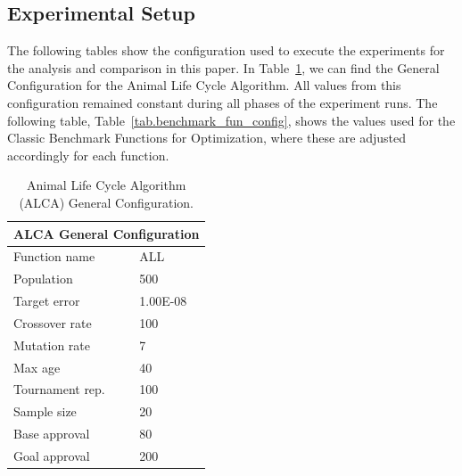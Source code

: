 \documentclass[graybox]{svmult}
\begin{document}
    \subsection{Experimental Setup} 

        The following tables show the configuration used to execute the experiments for
        the analysis and comparison in this paper. In
        Table~\ref{tab.general_configuration}, we can find the General Configuration
        for the Animal Life Cycle Algorithm. All values from this configuration
        remained constant during all phases of the experiment runs. The following
        table, Table~\ref{tab.benchmark_fun_config}, shows the values used for the
        Classic Benchmark Functions for Optimization, where these are adjusted
        accordingly for each function.

        \begin{table}[]
            \scriptsize
            \centering
            \caption{Animal Life Cycle Algorithm (ALCA) General Configuration.}\label{tab.general_configuration}
            \begin{tabular}{@{}ll@{}}
            \toprule
            \multicolumn{2}{l}{\textbf{ALCA General Configuration}} \\ \midrule
            Function name & ALL \\
            Population & 500 \\
            Target error & 1.00E-08 \\
            Crossover rate & 100 \\
            Mutation rate & 7 \\
            Max age & 40 \\
            Tournament rep. & 100 \\
            Sample size & 20 \\
            Base approval & 80 \\
            Goal approval & 200 \\ \bottomrule
            \end{tabular}
            \end{table}
\end{document}
